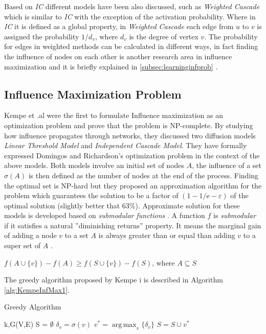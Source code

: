 \documentclass[english]{tktltiki}
\DeclareMathOperator*{\argmax}{arg\,max}
\begin{document}
Based on \textit{IC} different models have been also discussed, such as \textit{Weighted Cascade} which is similar to \textit{IC} with the exception of the activation probability. Where in \textit{IC} it is defined as a global property, in \textit{Weighted Cascade} each edge from $u$ to $v$ is assigned the probability $1/d_v$, where $d_v$ is the degree of vertex $v$. The probability for edges in weighted methods can be calculated in different ways, in fact finding the influence of nodes on each other is another research area in influence maximization and it is briefly explained in \ref{subsec:learninginfprob} .

\subsection{Influence Maximization Problem}
Kempe et .al \cite{kempe03} were the first to formulate Influence maximization as an optimization problem and prove that the problem is NP-complete. By studying how influence propagates through networks, they discussed two diffusion models \textit{Linear Threshold Model} and \textit{Independent Cascade Model}. They have formally expressed Domingos and Richardson's \cite{domingo01} optimization problem in the context of the above models. Both models involve an initial set of nodes $A$, the influence of a set $\sigma (A)$ is then defined as the number of nodes at the end of the process. Finding the optimal set is NP-hard but they proposed an approximation algorithm for the problem which guarantees the solution to be a factor of $(1 - 1/ \mathrm{e} - \varepsilon)$ of the optimal solution (slightly better that 63\%). 
Approximate solution for these models is developed based on \textit{submodular functions} \cite{nemhauser78}.
A function $f$ is \textit{submodular} if it satisfies a natural ''diminishing returns'' property. It means the marginal gain of adding a node $v$ to a set $A$ is always greater than or equal than adding $v$ to a super set of $A$ . 
\begin{center}
$f(A \cup \{v\}) - f(A) \geq f(S \cup \{v\}) - f(S)$, where $A \subseteq S$
\end{center}
The greedy algorithm proposed by Kempe i \cite{kempe03} is described in Algorithm \ref{alg:KempeInfMax1}. 
\begin{algorithm}[ht!]
\caption{Greedy Algorithm}
\label{alg:KempeInfMax1}
\begin{algorithmic}
\Require k,G(V,E)
\State S = $\emptyset$
		\State $\delta_v = \sigma(v)$
	\EndFor
	\State $v^* = \argmax_v \{\delta_v\}$
	\State $S = S \cup v^*$
\EndFor
\end{algorithmic}
\end{algorithm}
\end{document}
